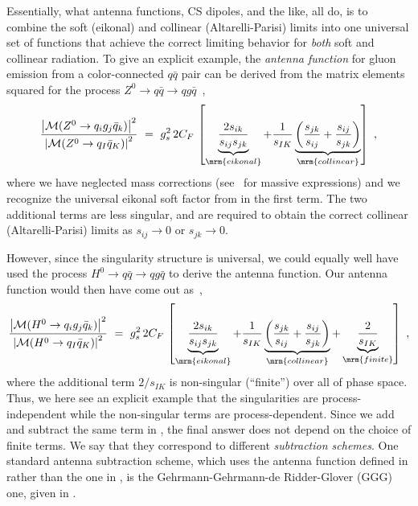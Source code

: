 Essentially,
what antenna functions, CS dipoles, and the like, all do, is to 
combine the soft (eikonal) and
collinear (Altarelli-Parisi) limits into one universal set of functions
that achieve the correct limiting behavior for \emph{both} 
soft and collinear radiation. 
To give an explicit example, the \emph{antenna function} for gluon
emission from a color-connected $q\bar{q}$ pair can be derived from
the matrix elements squared for the process $Z^0 \to q\bar{q} \to
qg\bar{q}$~\cite{Gustafson:1987rq}, 
\begin{equation}
\frac{\left\vert{\cal M}(Z^0\to q_i g_j \bar{q}_k)\right\vert^2}
{\left\vert{\cal M}(Z^0\to q_I \bar{q}_K)\right\vert^2}
\ = \ g_s^2 \,
2C_F \, \left[ \underbrace{\frac{2s_{ik}}{s_{ij}s_{jk}}}_{\mrm{eikonal}}
+ \frac{1}{s_{IK}}\underbrace{\left(
\frac{s_{jk}}{s_{ij}}
+ \frac{s_{ij}}{s_{jk}}
\right)}_\mrm{collinear} \right]~,\label{eq:subZ}
\end{equation}
where we have neglected mass corrections
(see~\cite{GehrmannDeRidder:2009fz,GehrmannDeRidder:2011dm} for
massive expressions) 
and we recognize the universal eikonal soft factor from 
in the first term. The two additional terms are less singular, and are
required to obtain the correct collinear (Altarelli-Parisi) 
limits as $s_{ij}\to 0$ or $s_{jk} \to 0$. 

However, since the singularity structure is universal, we could
equally well have used the process
$H^0 \to q\bar{q} \to qg\bar{q}$ to derive the antenna function.
Our antenna function would then have come out as~\cite{GehrmannDeRidder:2011dm},
\begin{equation}
\frac{\left\vert{\cal M}(H^0\to q_i g_j \bar{q}_k)\right\vert^2}
{\left\vert{\cal M}(H^0\to q_I \bar{q}_K)\right\vert^2}
\ = \ g_s^2 \,
2C_F \, \left[ \underbrace{\frac{2s_{ik}}{s_{ij}s_{jk}}}_{\mrm{eikonal}}
+ \frac{1}{s_{IK}}\underbrace{\left(
\frac{s_{jk}}{s_{ij}}
+ \frac{s_{ij}}{s_{jk}}
\right)}_\mrm{collinear}
+ \underbrace{\frac{2}{s_{IK}}}_{\mrm{finite}}\right]~,
\label{eq:subH}
\end{equation}
where the additional term $2/s_{IK}$ is non-singular (``finite'') over
all of phase space. Thus, we here see an explicit example that the
singularities are process-independent 
while the non-singular terms are process-dependent. 
Since we add and subtract
the same term in , the final answer does not depend
on the choice of finite terms. 
We say that they correspond to different \emph{subtraction
schemes}. One standard antenna subtraction scheme, which uses the
antenna function defined in  rather than the one
in , is the Gehrmann-Gehrmann-de Ridder-Glover (GGG)
one, given in \cite{GehrmannDeRidder:2005cm}. 


